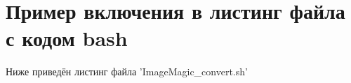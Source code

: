 \section{Пример включения в листинг файла с кодом bash}

Ниже приведён листинг файла 'ImageMagic\_convert.sh'

